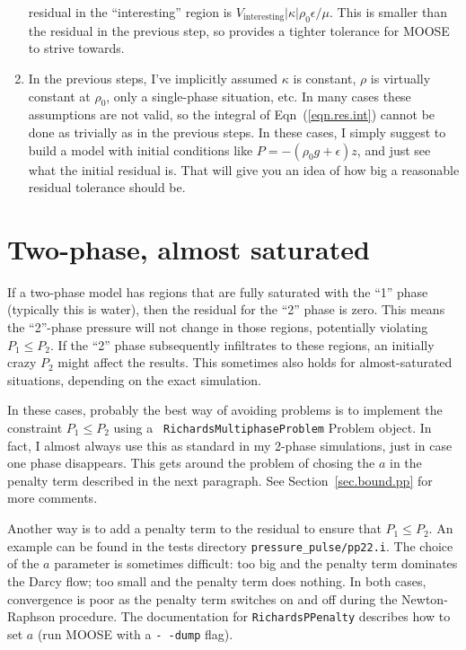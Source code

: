 \documentclass[]{scrreprt}
\begin{document}
\begin{enumerate}
  residual in the ``interesting'' region is
  $V_{\mathrm{interesting}}|\kappa|\rho_{0}\epsilon/\mu$.  This is smaller
  than the residual in the previous step, so provides a tighter
  tolerance for MOOSE to strive towards.
\item In the previous steps, I've implicitly assumed $\kappa$ is
  constant, $\rho$ is virtually constant at $\rho_{0}$, only a
  single-phase situation, etc.  In many cases these assumptions are
  not valid, so the integral of Eqn~(\ref{eqn.res.int}) cannot be done
  as trivially as in the previous steps.  In these cases, I simply
  suggest to build a model with initial conditions like $P =
  -(\rho_{0} g + \epsilon)z$, and just see what the initial residual is.
  That will give you an idea of how big a reasonable residual
  tolerance should be.
\end{enumerate}


\chapter{Two-phase, almost saturated}

If a two-phase model has regions that are fully saturated with the
``1'' phase (typically this is water), then the residual for the ``2''
phase is zero.  This means the ``2''-phase pressure will not change in
those regions, potentially violating $P_{1}\leq P_{2}$.  If the ``2''
phase subsequently infiltrates to these regions, an initially crazy
$P_{2}$ might affect the results.  This sometimes also holds for
almost-saturated situations, depending on the exact simulation.

In these cases, probably the best way of avoiding problems is to
implement the constraint $P_{1}\leq P_{2}$ using a {\tt
  RichardsMultiphaseProblem} Problem object.  In fact, I almost always
use this as standard in my 2-phase simulations, just in case one phase
disappears.  This gets around the
problem of chosing the $a$ in the penalty term described in the next
paragraph.  See Section~\ref{sec.bound.pp} for more comments.

Another way is to add a penalty term to the residual to
ensure that $P_{1}\leq P_{2}$.  An example can be found in the tests
directory {\tt pressure\_pulse/pp22.i}.  The choice of the $a$
parameter is sometimes difficult: too big and the penalty term
dominates the Darcy flow; too small and the penalty term does
nothing.  In both cases, convergence is poor as the penalty term
switches on and off during the Newton-Raphson procedure.  The
documentation for {\tt RichardsPPenalty} describes how to set $a$ (run
MOOSE with a {\tt -\,-dump} flag).
\end{document}
